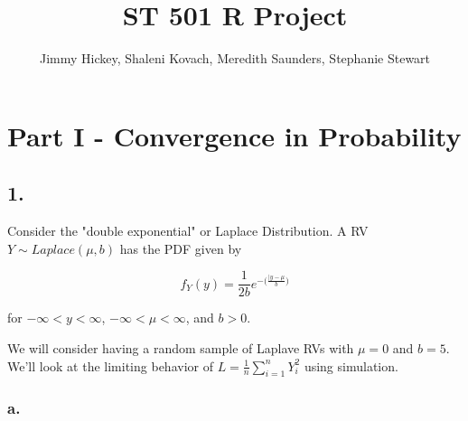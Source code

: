 \documentclass[12pt]{article}
\title{ST 501 R Project}
\author{Jimmy Hickey, Shaleni Kovach, Meredith Saunders, Stephanie Stewart}
\begin{document}
\maketitle
\tableofcontents
\clearpage

\doublespacing

\section{Part I - Convergence in Probability}

\subsection{1.}
Consider the "double exponential" or Laplace Distribution. A RV $Y \sim Laplace(\mu, b)$ has the PDF given by

$$f_Y(y) = \frac{1}{2b}e^{-\Big(  \frac{|y-\mu}{b}   \Big) } $$

for $-\infty < y < \infty$, $-\infty < \mu < \infty$, and $b>0.$

We will consider having a random sample of Laplave RVs with $\mu = 0$ and $b = 5$. We'll look at the limiting behavior of $L=\frac{1}{n}\sum_{i=1}^{n}Y_i^2$ using simulation.

\subsubsection{a.}
\end{document}
